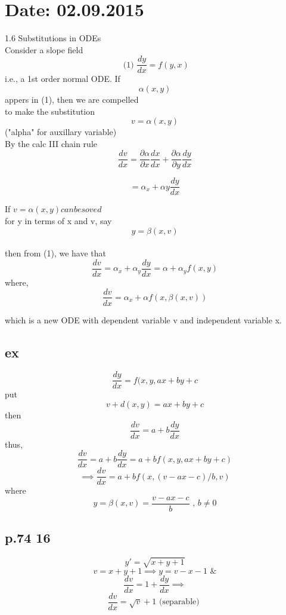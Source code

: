 \documentclass[10pt,a4paper]{article}
\begin{document}


\newpage 
{}
\section{Date: 02.09.2015}
  1.6 Substitutions in ODEs \\
  Consider a slope field  \\
  \[ \text{ (1) } \frac{dy}{dx} = f(y, x)\]
  i.e., a 1st order normal ODE. If
  \[ \alpha (x, y)\]
  appers in (1), then we are compelled  \\
  to make the substitution  \\
  \[ v = \alpha (x, y)\]
  ("alpha" for auxillary variable) \\
  By the calc III chain rule\nonumber\\
  \[ \frac{dv}{dx} = \frac{\partial\alpha}{\partial x} \frac{dx}{dx} + \frac{\partial
  \alpha}{\partial y} \frac{dy}{dx}\]

  \[ = \alpha_x + \alpha y \frac{dy}{dx}\]

  If \( v = \alpha (x, y) can be soved \) \\
  for y in terms of x and v, say  \\
  \[ y = \beta(x, v) \] \\
  then from (1), we have that  \\
  \[ \frac{dv}{dx} = \alpha_x + \alpha_y \frac{dy}{dx} = \alpha +
  \alpha_y f(x, y) \]
  where, 
  \[ \boxed{ \frac{dv}{dx} = \alpha_x + \alpha f(x, \beta(x, v))}\]

  which is a new ODE with dependent variable v
  and independent variable x. 
  \subsection{ex}
  \[ \frac{dy}{dx} = f(x, y , ax+by+c\]
  put 
  \[ v + d(x, y) = ax + by + c\]
  then 
  \[ \frac{dv}{dx} = a + b \frac{dy}{dx}\]
  thus, 
  \[ \frac{dv}{dx} = a + b \frac{dy}{dx} = a + b f(x, y, ax + by +c)\]
  \[ \implies \boxed{\frac{dv}{dx} = a + b f(x, (v-ax-c)/b, v)}\]
  where 
  \[ y = \beta (x, v) = \frac{v-ax-c}{b} \text{ , } b \neq 0\]

  \subsection{p.74 16}
  \[ y' = \sqrt{x+y+1}\]
  \[ v = x + y + 1 \implies y = v - x - 1 \text{ \& } \]
  \[ \frac{dv}{dx} = 1 + \frac{dy}{dx} \implies \]
  \[ \frac{dv}{dx} = \sqrt{v} + 1 \text{ (separable) }\]
\end{document}
